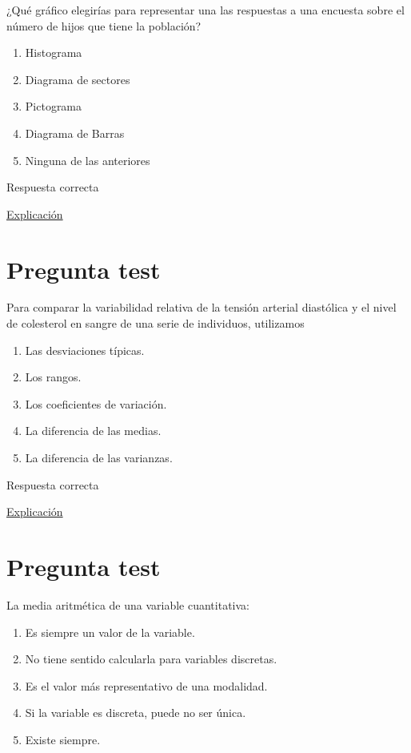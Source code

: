 \documentclass[
]{book}
\providecommand{\tightlist}{%
  \setlength{\itemsep}{0pt}\setlength{\parskip}{0pt}}
\begin{document}
¿Qué gráfico elegirías para representar una las respuestas a una encuesta sobre el número de hijos que tiene la población?

\begin{enumerate}
\def\labelenumi{\alph{enumi})}
\tightlist
\item
  Histograma
\item
  Diagrama de sectores
\item
  Pictograma
\item
  Diagrama de Barras
\item
  Ninguna de las anteriores
\end{enumerate}

Respuesta correcta

\href{https://1fjmanzano.github.io/bioestadistica/diagramas-de-barras-y-sectores.html}{Explicación}

\hypertarget{pregunta-test-58}{%
\section{Pregunta test}\label{pregunta-test-58}}

Para comparar la variabilidad relativa de la tensión arterial diastólica y el nivel de colesterol en sangre de una serie de individuos, utilizamos

\begin{enumerate}
\def\labelenumi{\alph{enumi})}
\tightlist
\item
  Las desviaciones típicas.
\item
  Los rangos.
\item
  Los coeficientes de variación.
\item
  La diferencia de las medias.
\item
  La diferencia de las varianzas.
\end{enumerate}

Respuesta correcta

\href{https://1fjmanzano.github.io/bioestadistica/medidas-de-posicio\%CC\%81n-dispersio\%CC\%81n-y-forma.html}{Explicación}

\hypertarget{pregunta-test-59}{%
\section{Pregunta test}\label{pregunta-test-59}}

La media aritmética de una variable cuantitativa:

\begin{enumerate}
\def\labelenumi{\alph{enumi})}
\tightlist
\item
  Es siempre un valor de la variable.
\item
  No tiene sentido calcularla para variables discretas.
\item
  Es el valor más representativo de una modalidad.
\item
  Si la variable es discreta, puede no ser única.
\item
  Existe siempre.
\end{enumerate}
\end{document}
